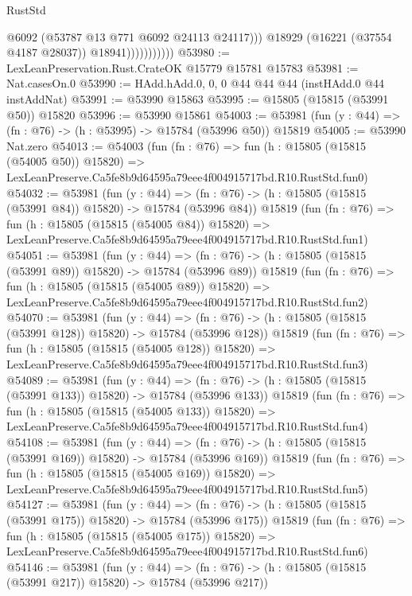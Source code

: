 \begin{lexlean}{RustStd}
\begin{coremodule}
                              @6092
                              (@53787 @13 @771 @6092 @24113 @24117)))
                          @18929
                          (@16221 (@37554 @4187 @28037))
                          @18941)))))))))))
@53980 := LexLeanPreservation.Rust.CrateOK @15779 @15781 @15783
@53981 := Nat.casesOn.{0}
@53990 := HAdd.hAdd.{0, 0, 0} @44 @44 @44 (instHAdd.{0} @44 instAddNat)
@53991 := @53990 @15863
@53995 := @15805 (@15815 (@53991 @50)) @15820
@53996 := @53990 @15861
@54003 := @53981 (fun (y : @44) => (fn : @76) -> (h : @53995) -> @15784 (@53996 @50)) @15819
@54005 := @53990 Nat.zero
@54013 := @54003
    (fun (fn : @76) =>
    fun (h : @15805 (@15815 (@54005 @50)) @15820) =>
    LexLeanPreserve.Ca5fe8b9d64595a79eee4f004915717bd.R10.RustStd.fun0)
@54032 := @53981
    (fun (y : @44) =>
    (fn : @76) -> (h : @15805 (@15815 (@53991 @84)) @15820) -> @15784 (@53996 @84))
    @15819
    (fun (fn : @76) =>
    fun (h : @15805 (@15815 (@54005 @84)) @15820) =>
    LexLeanPreserve.Ca5fe8b9d64595a79eee4f004915717bd.R10.RustStd.fun1)
@54051 := @53981
    (fun (y : @44) =>
    (fn : @76) -> (h : @15805 (@15815 (@53991 @89)) @15820) -> @15784 (@53996 @89))
    @15819
    (fun (fn : @76) =>
    fun (h : @15805 (@15815 (@54005 @89)) @15820) =>
    LexLeanPreserve.Ca5fe8b9d64595a79eee4f004915717bd.R10.RustStd.fun2)
@54070 := @53981
    (fun (y : @44) =>
    (fn : @76) -> (h : @15805 (@15815 (@53991 @128)) @15820) -> @15784 (@53996 @128))
    @15819
    (fun (fn : @76) =>
    fun (h : @15805 (@15815 (@54005 @128)) @15820) =>
    LexLeanPreserve.Ca5fe8b9d64595a79eee4f004915717bd.R10.RustStd.fun3)
@54089 := @53981
    (fun (y : @44) =>
    (fn : @76) -> (h : @15805 (@15815 (@53991 @133)) @15820) -> @15784 (@53996 @133))
    @15819
    (fun (fn : @76) =>
    fun (h : @15805 (@15815 (@54005 @133)) @15820) =>
    LexLeanPreserve.Ca5fe8b9d64595a79eee4f004915717bd.R10.RustStd.fun4)
@54108 := @53981
    (fun (y : @44) =>
    (fn : @76) -> (h : @15805 (@15815 (@53991 @169)) @15820) -> @15784 (@53996 @169))
    @15819
    (fun (fn : @76) =>
    fun (h : @15805 (@15815 (@54005 @169)) @15820) =>
    LexLeanPreserve.Ca5fe8b9d64595a79eee4f004915717bd.R10.RustStd.fun5)
@54127 := @53981
    (fun (y : @44) =>
    (fn : @76) -> (h : @15805 (@15815 (@53991 @175)) @15820) -> @15784 (@53996 @175))
    @15819
    (fun (fn : @76) =>
    fun (h : @15805 (@15815 (@54005 @175)) @15820) =>
    LexLeanPreserve.Ca5fe8b9d64595a79eee4f004915717bd.R10.RustStd.fun6)
@54146 := @53981
    (fun (y : @44) =>
    (fn : @76) -> (h : @15805 (@15815 (@53991 @217)) @15820) -> @15784 (@53996 @217))

\end{coremodule}
\end{lexlean}
